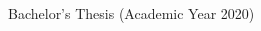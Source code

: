 \begin{titlepage}
  \begin{center}
    \begin{large}
      Bachelor’s Thesis (Academic Year 2020)\\
      \vspace{24pt}
      \begin{spacing}{1.4}
        {\huge\textbf{\etitle}}\\
      \end{spacing}
    \end{large}
  \end{center}
  \vspace{40em}
  \begin{flushright}
    \large \edept\\
    \eauthor
  \end{flushright}
\end{titlepage}
